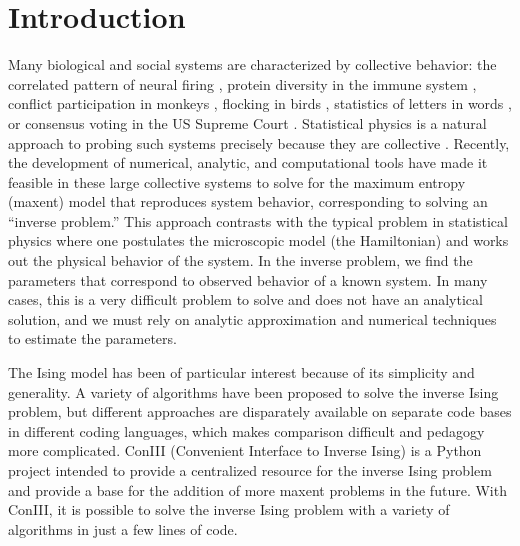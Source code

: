 \documentclass[aps,prl,twocolumn,nofootinbib]{revtex4-1}
\begin{document}
\section{Introduction}
Many biological and social systems are characterized by collective behavior: the correlated pattern of neural firing \cite{Schneidman:2006he}, protein diversity in the immune system \cite{Mora:2010jxa}, conflict participation in monkeys \cite{Daniels:2017cq}, flocking in birds \cite{Bialek:2012cs}, statistics of letters in words \cite{Stephens:2010hi}, or consensus voting in the US Supreme Court \cite{Lee:2015ev}. Statistical physics is a natural approach to probing such systems precisely because they are collective \cite{Castellano:2009ce}.
Recently, the development of numerical, analytic, and computational tools have made it feasible in these large collective systems to solve for the maximum entropy (maxent) model that reproduces system behavior, corresponding to solving an ``inverse problem.''
This approach contrasts with the typical problem in statistical physics where one postulates the microscopic model (the Hamiltonian) and works out the physical behavior of the system. In the inverse problem, we  find the parameters that correspond to observed behavior of a known system. In many cases, this is a very difficult problem to solve and does not have an analytical solution, and we must rely on analytic approximation and numerical techniques to estimate the parameters.

The Ising model has been of particular interest because of its simplicity and generality. A variety of algorithms have been proposed to solve the inverse Ising problem, but different approaches are disparately available on separate code bases in different coding languages, which makes comparison difficult and pedagogy more complicated.
ConIII (Convenient Interface to Inverse Ising) is a Python project intended to provide a centralized resource for the inverse Ising problem and provide a base for the addition of more maxent problems in the future. With ConIII, it is possible to solve the inverse Ising problem with a variety of algorithms in just a few lines of code.
\end{document}

